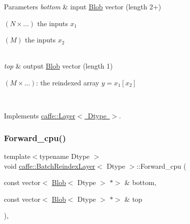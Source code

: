 \begin{DoxyParams}{Parameters}
{\em bottom} & input \mbox{\hyperlink{classcaffe_1_1_blob}{Blob}} vector (length 2+)
\begin{DoxyEnumerate}
\item $ (N \times ...) $ the inputs $ x_1 $
\item $ (M) $ the inputs $ x_2 $ 
\end{DoxyEnumerate}\\
\hline
{\em top} & output \mbox{\hyperlink{classcaffe_1_1_blob}{Blob}} vector (length 1)
\begin{DoxyEnumerate}
\item $ (M \times ...) $\+: the reindexed array $ y = x_1[x_2] $ 
\end{DoxyEnumerate}\\
\hline
\end{DoxyParams}


Implements \mbox{\hyperlink{classcaffe_1_1_layer_a576ac6a60b1e99fe383831f52a6cea77}{caffe\+::\+Layer$<$ Dtype $>$}}.

\mbox{\label{classcaffe_1_1_batch_reindex_layer_af7de3792af32dc8025c359700bd40b5e}} 
\subsubsection{\texorpdfstring{Forward\+\_\+cpu()}{Forward\_cpu()}\hspace{0.1cm}{\footnotesize\ttfamily [2/2]}}
{\footnotesize\ttfamily template$<$typename Dtype $>$ \\
void \mbox{\hyperlink{classcaffe_1_1_batch_reindex_layer}{caffe\+::\+Batch\+Reindex\+Layer}}$<$ Dtype $>$\+::Forward\+\_\+cpu (\begin{DoxyParamCaption}\item[{const vector$<$ \mbox{\hyperlink{classcaffe_1_1_blob}{Blob}}$<$ Dtype $>$ $\ast$$>$ \&}]{bottom,  }\item[{const vector$<$ \mbox{\hyperlink{classcaffe_1_1_blob}{Blob}}$<$ Dtype $>$ $\ast$$>$ \&}]{top }\end{DoxyParamCaption})\hspace{0.3cm}{\ttfamily [protected]}, {\ttfamily [virtual]}}


